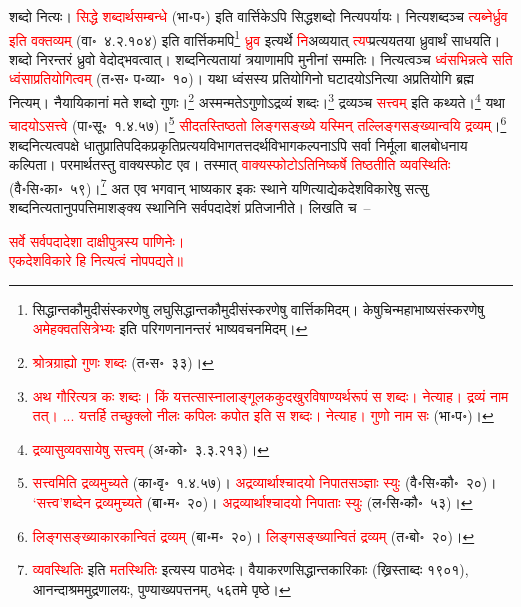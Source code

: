 \begin{sloppypar}\justifying\noindent शब्दो नित्यः। \textcolor{red}{सिद्धे शब्दार्थ\-सम्बन्धे} (भा॰प॰) इति वार्त्तिकेऽपि सिद्ध\-शब्दो नित्य\-पर्यायः। नित्य\-शब्दञ्च \textcolor{red}{त्यब्नेर्ध्रुव इति वक्तव्यम्} (वा॰~४.२.१०४) इति वार्त्तिकमपि\footnote{सिद्धान्त\-कौमुदी\-संस्करणेषु लघु\-सिद्धान्त\-कौमुदी\-संस्करणेषु वार्त्तिकमिदम्। केषुचिन्महाभाष्य\-संस्करणेषु \textcolor{red}{अमेहक्वतसित्रेभ्यः} इति परिगणनानन्तरं भाष्य\-वचनमिदम्।} \textcolor{red}{ध्रुव} इत्यर्थे
\textcolor{red}{नि}\-अव्ययात् \textcolor{red}{त्यप्}\-प्रत्ययतया ध्रुवार्थं साधयति। शब्दो निरन्तरं ध्रुवो वेदोद्भवत्वात्। शब्द\-नित्यतायां त्रयाणामपि मुनीनां सम्मतिः। नित्यत्वञ्च \textcolor{red}{ध्वंस\-भिन्नत्वे सति ध्वंसाप्रतियोगित्वम्} (त॰स॰ प॰व्या॰~१०)। यथा ध्वंसस्य प्रतियोगिनो घटादयोऽनित्या अप्रतियोगि ब्रह्म नित्यम्। नैयायिकानां मते शब्दो गुणः।\footnote{\textcolor{red}{श्रोत्रग्राह्यो गुणः शब्दः} (त॰स॰~३३)।}
अस्मन्मतेऽगुणोऽद्रव्यं शब्दः।\footnote{\textcolor{red}{अथ गौरित्यत्र कः शब्दः। किं यत्तत्सास्ना\-लाङ्गूल\-ककुद\-खुर\-विषाण्यर्थरूपं स शब्दः। नेत्याह। द्रव्यं नाम तत्। ... यत्तर्हि तच्छुक्लो नीलः कपिलः कपोत इति स शब्दः। नेत्याह। गुणो नाम सः} (भा॰प॰)।} द्रव्यञ्च \textcolor{red}{सत्त्वम्} इति कथ्यते।\footnote{\textcolor{red}{द्रव्यासुव्यवसायेषु सत्त्वम्} (अ॰को॰~३.३.२१३)।} यथा \textcolor{red}{चादयोऽसत्त्वे} (पा॰सू॰~१.४.५७)।\footnote{\textcolor{red}{सत्त्वमिति द्रव्यमुच्यते} (का॰वृ॰~१.४.५७)। \textcolor{red}{अद्रव्यार्थाश्चादयो निपातसञ्ज्ञाः स्युः} (वै॰सि॰कौ॰~२०)। \textcolor{red}{‘सत्त्व’शब्देन द्रव्यमुच्यते} (बा॰म॰~२०)। \textcolor{red}{अद्रव्यार्थाश्चादयो निपाताः स्युः} (ल॰सि॰कौ॰~५३)।} \textcolor{red}{सीदतस्तिष्ठतो लिङ्ग\-सङ्ख्ये यस्मिन् तल्लिङ्ग\-सङ्ख्यान्वयि द्रव्यम्}।\footnote{\textcolor{red}{लिङ्गसङ्ख्याकारकान्वितं द्रव्यम्} (बा॰म॰~२०)। \textcolor{red}{लिङ्गसङ्ख्यान्वितं द्रव्यम्} (त॰बो॰~२०)।} शब्द\-नित्यत्व\-पक्षे धातु\-प्रातिपदिक\-प्रकृति\-प्रत्यय\-विभाग\-तत्तदर्थ\-विभाग\-कल्पनाऽपि सर्वा निर्मूला बाल\-बोधनाय कल्पिता। परमार्थतस्तु वाक्य\-स्फोट एव। तस्मात् \textcolor{red}{वाक्य\-स्फोटोऽति\-निष्कर्षे तिष्ठतीति व्यवस्थितिः} (वै॰सि॰का॰~५९)।\footnote{\textcolor{red}{व्यवस्थितिः} इति \textcolor{red}{मतस्थितिः} इत्यस्य पाठभेदः। वैयाकरण\-सिद्धान्त\-कारिकाः (ख्रिस्ताब्दः १९०१), आनन्दाश्रम\-मुद्रणालयः, पुण्याख्य\-पत्तनम्, ५६तमे पृष्ठे।} अत एव भगवान् भाष्यकार इकः स्थाने यणित्याद्येकदेश\-विकारेषु 
सत्सु शब्द\-नित्यतानुपपत्तिमाशङ्क्य स्थानिनि सर्वपदादेशं प्रतिजानीते। लिखति च~–\end{sloppypar}
\centering\textcolor{red}{सर्वे सर्वपदादेशा दाक्षीपुत्रस्य पाणिनेः।\nopagebreak\\
एकदेशविकारे हि नित्यत्वं नोपपद्यते॥}\nopagebreak\\
